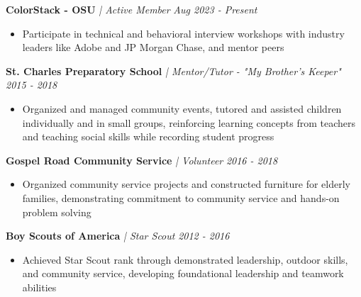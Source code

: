 \documentclass[letterpaper]{article}
\newenvironment{tightitemize}{%
  \begin{itemize}\small\setlength{\baselineskip}{0.95\baselineskip}\itemsep -1mm%
}{\end{itemize}}
\begin{document}
    \textbf{ColorStack - OSU} \textit{| Active Member} \hfill \textsl{Aug 2023 - Present}\\
    \vspace{-2mm}
    \begin{tightitemize} \itemsep -1mm
    
        \item Participate in technical and behavioral interview workshops with industry leaders like Adobe and JP Morgan Chase, and mentor peers
        
    \end{tightitemize}
    \vspace{-1mm}

    \textbf{St. Charles Preparatory School} \textit{| Mentor/Tutor - "My Brother's Keeper"} \hfill \textsl{2015 - 2018}\\
    \vspace{-2mm}
    \begin{tightitemize} \itemsep -1mm
    
        \item Organized and managed community events, tutored and assisted children individually and in small groups, reinforcing learning concepts from teachers and teaching social skills while recording student progress
        
    \end{tightitemize}
    \vspace{-1mm}

    \textbf{Gospel Road Community Service} \textit{| Volunteer} \hfill \textsl{2016 - 2018}\\
    \vspace{-2mm}
    \begin{tightitemize} \itemsep -1mm
    
        \item Organized community service projects and constructed furniture for elderly families, demonstrating commitment to community service and hands-on problem solving
        
    \end{tightitemize}
    \vspace{-1mm}

    \textbf{Boy Scouts of America} \textit{| Star Scout} \hfill \textsl{2012 - 2016}\\
    \vspace{-2mm}
    \begin{tightitemize} \itemsep -1mm
    
        \item Achieved Star Scout rank through demonstrated leadership, outdoor skills, and community service, developing foundational leadership and teamwork abilities
        
    \end{tightitemize}
    \vspace{-1mm}
\end{document}
